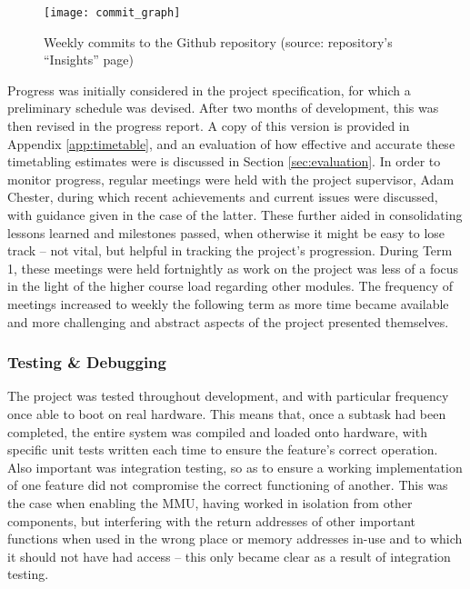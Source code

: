         \begin{figure}[h]
            \centering
            \texttt{[image: commit\_graph]}
            \caption{Weekly commits to the Github repository (source:
            repository's ``Insights'' page)}
            \label{fig:commits}
        \end{figure}

        Progress was initially considered in the project specification, for
        which a preliminary schedule was devised. After two months of
        development, this was then revised in the progress report.  A copy of
        this version is provided in Appendix \ref{app:timetable}, and an
        evaluation of how effective and accurate these timetabling estimates
        were is discussed in Section \ref{sec:evaluation}. In order to monitor
        progress, regular meetings were held with the project supervisor, Adam
        Chester, during which recent achievements and current issues were
        discussed, with guidance given in the case of the latter. These further
        aided in consolidating lessons learned and milestones passed, when
        otherwise it might be easy to lose track -- not vital, but helpful in
        tracking the project's progression. During Term 1, these meetings were
        held fortnightly as work on the project was less of a focus in the light
        of the higher course load regarding other modules. The frequency of
        meetings increased to weekly the following term as more time became
        available and more challenging and abstract aspects of the project
        presented themselves.

    \subsubsection{Testing \& Debugging}
        \label{sec:design_testing}
        The project was tested throughout development, and with particular
        frequency once able to boot on real hardware. This means that, once a
        subtask had been completed, the entire system was compiled and loaded
        onto hardware, with specific unit tests written each time to ensure the
        feature's correct operation. Also important was integration testing, so
        as to ensure a working implementation of one feature did not compromise
        the correct functioning of another. This was the case when enabling the
        MMU, having worked in isolation from other components, but interfering
        with the return addresses of other important functions when used in the
        wrong place or memory addresses in-use and to which it should not have
        had access -- this only became clear as a result of integration testing.

